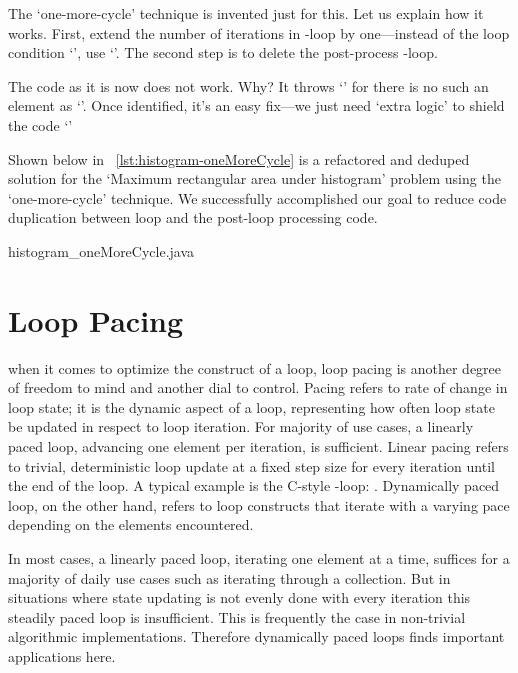 The `one-more-cycle' technique is invented just for this.
Let us explain how it works.
First, extend the number of iterations in -loop by one---instead of the loop
condition `', use `'.
The second step is to delete the post-process -loop.


The code as it is now does not work.
Why?
It throws `' for there is no such an element as
`'.
Once identified, it's an easy fix---we just need `extra logic' to shield
the code `'


Shown below in ~\autoref{lst:histogram-oneMoreCycle} is
a refactored and deduped solution for the `Maximum rectangular area under
histogram' problem using the `one-more-cycle' technique.
We successfully accomplished our goal to
reduce code duplication between loop and the post-loop processing code.

{histogram_oneMoreCycle.java}


\section{Loop Pacing}\label{sec:loop-pacing}

when it comes to optimize the construct of a loop, loop pacing is another degree of
freedom to mind and another dial to control.
Pacing refers to rate of change in loop state;
it is the dynamic aspect of a loop, representing how often loop state be updated in
respect to loop iteration.
For majority of use cases, a linearly paced loop, advancing one element per iteration, is
sufficient.
Linear pacing refers to trivial, deterministic loop update at a fixed step size for every
iteration until the end of the loop.
A typical example is the C-style -loop: .
Dynamically paced loop, on the other hand, refers to loop constructs that iterate
with a varying pace depending on the elements encountered.


In most cases, a linearly paced loop, iterating one element at a time, suffices
for a majority of daily use cases such as iterating through a collection.
But in situations where state updating is not evenly done with every iteration this steadily
paced loop is insufficient.
This is frequently the case in non-trivial algorithmic implementations.
Therefore dynamically paced loops finds important applications here.


